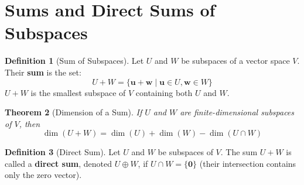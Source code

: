 \documentclass[11pt]{article}
\newtheorem{theorem}{Theorem}[section]
\theoremstyle{definition}
\newtheorem{definition}[theorem]{Definition}
\theoremstyle{remark}
\newcommand{\dimn}{\operatorname{dim}}
\begin{document}
\section{Sums and Direct Sums of Subspaces}

\begin{definition}[Sum of Subspaces]
Let $U$ and $W$ be subspaces of a vector space $V$. Their \textbf{sum} is the set:
\[ U + W = \{ \mathbf{u} + \mathbf{w} \mid \mathbf{u} \in U, \mathbf{w} \in W \} \]
$U+W$ is the smallest subspace of $V$ containing both $U$ and $W$.
\end{definition}

\begin{theorem}[Dimension of a Sum]
If $U$ and $W$ are finite-dimensional subspaces of $V$, then
\[ \dimn(U + W) = \dimn(U) + \dimn(W) - \dimn(U \cap W) \]
\end{theorem}

\begin{definition}[Direct Sum]
Let $U$ and $W$ be subspaces of $V$. The sum $U+W$ is called a \textbf{direct sum}, denoted $U \oplus W$, if $U \cap W = \{\mathbf{0}\}$ (their intersection contains only the zero vector).
\end{definition}
\end{document}
